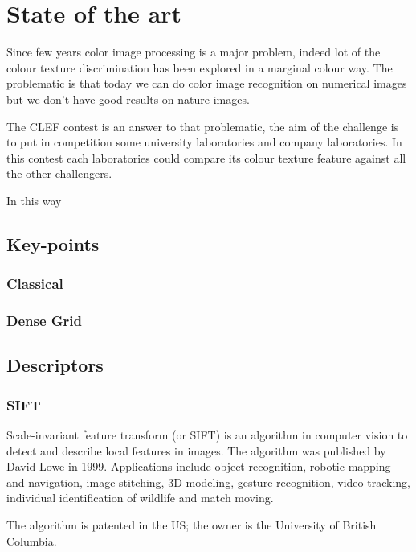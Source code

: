 \documentclass[12pt]{article}
\begin{document}
\section{State of the art}

Since few years color image processing is a major problem, indeed lot of the colour texture discrimination has been explored in a marginal colour way. The problematic is that today we can do color image recognition on numerical images but we don't have good results on nature images. 

The CLEF contest is an answer to that problematic, the aim of the challenge is to put in competition some university laboratories and company laboratories. In this contest each laboratories could compare its colour texture feature against all the other challengers.

In this way 

\subsection{Key-points}

\subsubsection{Classical}

\subsubsection{Dense Grid}


\subsection{Descriptors}

\subsubsection{SIFT}
Scale-invariant feature transform (or SIFT) is an algorithm in computer vision to detect and describe local features in images. The algorithm was published by David Lowe in 1999.
Applications include object recognition, robotic mapping and navigation, image stitching, 3D modeling, gesture recognition, video tracking, individual identification of wildlife and match moving.

The algorithm is patented in the US; the owner is the University of British Columbia.
\end{document}
